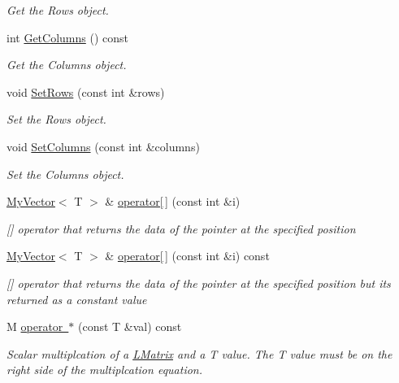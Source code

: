 \begin{DoxyCompactItemize}
\begin{DoxyCompactList}\small\item\em Get the Rows object. \end{DoxyCompactList}\item 
int \mbox{\hyperlink{class_matrix_controller_a2d895a5b210bfc295308f97084e78002}{Get\+Columns}} () const
\begin{DoxyCompactList}\small\item\em Get the Columns object. \end{DoxyCompactList}\item 
void \mbox{\hyperlink{class_matrix_controller_ad659b02670dce5a4d1e6a1b73ca63513}{Set\+Rows}} (const int \&rows)
\begin{DoxyCompactList}\small\item\em Set the Rows object. \end{DoxyCompactList}\item 
void \mbox{\hyperlink{class_matrix_controller_a6e68e5f2260f1d80afc5891c60301927}{Set\+Columns}} (const int \&columns)
\begin{DoxyCompactList}\small\item\em Set the Columns object. \end{DoxyCompactList}\item 
\mbox{\hyperlink{class_my_vector}{My\+Vector}}$<$ T $>$ \& \mbox{\hyperlink{class_matrix_controller_a944709b73c0cf4d0b962eb26840a896a}{operator\mbox{[}$\,$\mbox{]}}} (const int \&i)
\begin{DoxyCompactList}\small\item\em \mbox{[}\mbox{]} operator that returns the data of the pointer at the specified position \end{DoxyCompactList}\item 
\mbox{\hyperlink{class_my_vector}{My\+Vector}}$<$ T $>$ \& \mbox{\hyperlink{class_matrix_controller_a59cfd6e10abd1a90fa0a1090bb4de240}{operator\mbox{[}$\,$\mbox{]}}} (const int \&i) const
\begin{DoxyCompactList}\small\item\em \mbox{[}\mbox{]} operator that returns the data of the pointer at the specified position but its returned as a constant value \end{DoxyCompactList}\item 
M \mbox{\hyperlink{class_matrix_controller_abe35dc2b5a0ce975799995097486893e}{operator $\ast$}} (const T \&val) const
\begin{DoxyCompactList}\small\item\em Scalar multiplcation of a \mbox{\hyperlink{class_l_matrix}{L\+Matrix}} and a T value. The T value must be on the right side of the multiplcation equation. \end{DoxyCompactList}\item 

\end{DoxyCompactItemize}
